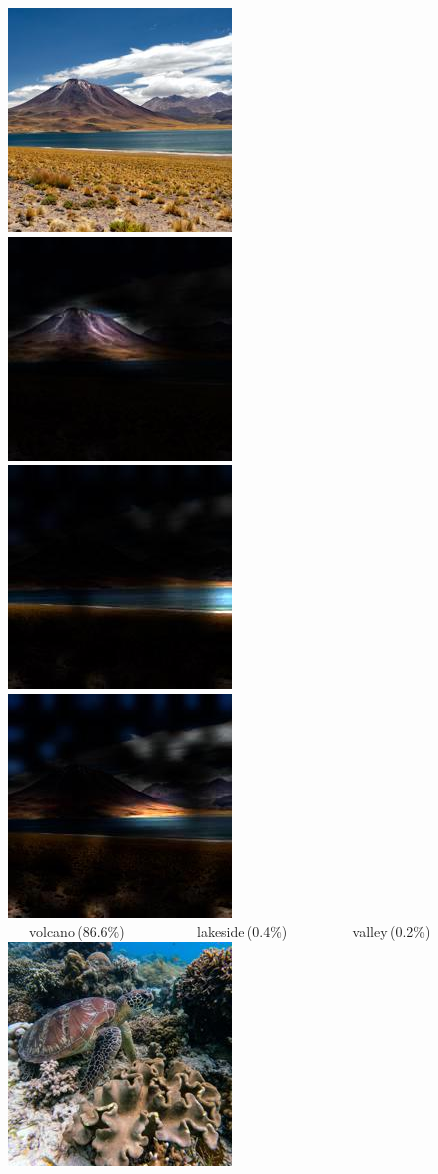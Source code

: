 \begin{figure}[t]
              \includegraphics[width=0.24\linewidth]{figs/multiclass/pexels-andre-ulysses-de-salis-7865866.jpg} \hfill%
              \includegraphics[width=0.24\linewidth]{figs/multiclass/attn0_multi_pexels-andre-ulysses-de-salis-7865866.jpg} \hfill %
              \includegraphics[width=0.24\linewidth]{figs/multiclass/attn1_multi_pexels-andre-ulysses-de-salis-7865866.jpg} \hfill %
              \includegraphics[width=0.24\linewidth]{figs/multiclass/attn2_multi_pexels-andre-ulysses-de-salis-7865866.jpg}  \\[-5pt] %
             {\scriptsize \phantom{0} \hspace{0.215\linewidth} ~~~volcano\,(86.6\%) ~~~~~~~~~ lakeside\,(0.4\%) ~~~~~~~~ valley\,(0.2\%)}%
              \\
              \includegraphics[width=0.24\linewidth]{figs/multiclass/pexels-keemkai-villadums-2435728.jpg} \hfill%

\end{figure}

